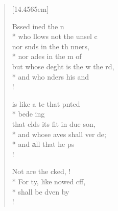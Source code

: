 {%
\parindent 0pt
\noindent
\ifx\preLilyPondExample \undefined
\else
  \expandafter\preLilyPondExample
\fi
\def\lilypondbook{}%

\ifx\postLilyPondExample \undefined
\else
  \expandafter\postLilyPondExample
\fi
}
\begin{flushleft}
\begin{verse}[14.4565em]

 Bssed ined  the n\\*
who llows not the unsel   c\\
nor snds in the th  nners,\\*
nor ades in the m of \\
 but whose deght is the w  the rd,\\*
and who nders his   and \\!

  is like a te that  pnted\\*
bede  ing \\
that elds its fit in due son,\flagflex{\dag}\\*
and whose aves shall ver de;\\*
and \textbf{a}ll that he   ps\\!

 Not  are the cked,  !\flagflex{\dag}\\*
For ty, like nowed cff,\\*
shall be dven  by  \\!


\end{verse}
\end{flushleft}
